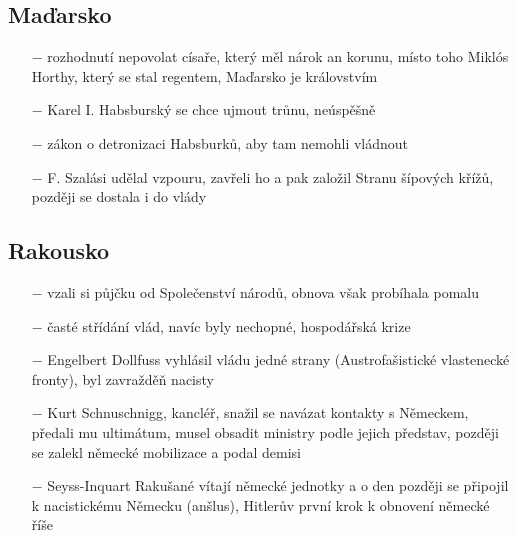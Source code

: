\documentclass{article}
\begin{document}
\subsection*{Maďarsko}
\begin{itemize}
    \vspace{-0.5em}
    \setlength\itemsep{0.15em}
    \item[$-$] rozhodnutí nepovolat císaře, který měl nárok an korunu, místo toho Miklós Horthy, který se stal regentem, Maďarsko je královstvím
    \item[$-$] Karel I. Habsburský se chce ujmout trůnu, neúspěšně
    \item[$-$] zákon o detronizaci Habsburků, aby tam nemohli vládnout
    \item[$-$] F. Szalási udělal vzpouru, zavřeli ho a pak založil Stranu šípových křížů, později se dostala i do vlády
\end{itemize}

\subsection*{Rakousko}
\begin{itemize}
    \vspace{-0.5em}
    \setlength\itemsep{0.15em}
    \item[$-$] vzali si půjčku od Společenství národů, obnova však probíhala pomalu
    \item[$-$] časté střídání vlád, navíc byly nechopné, hospodářská krize
    \item[$-$] Engelbert Dollfuss vyhlásil vládu jedné strany (Austrofašistické vlastenecké fronty), byl zavražděň nacisty
    \item[$-$] Kurt Schnuschnigg, kancléř, snažil se navázat kontakty s Německem, předali mu ultimátum, musel obsadit ministry podle jejich představ, později se zalekl německé mobilizace a podal demisi
    \item[$-$] Seyss-Inquart Rakušané vítají německé jednotky a o den později se připojil k nacistickému Německu (anšlus), Hitlerův první krok k obnovení německé říše
\end{itemize}
\end{document}
